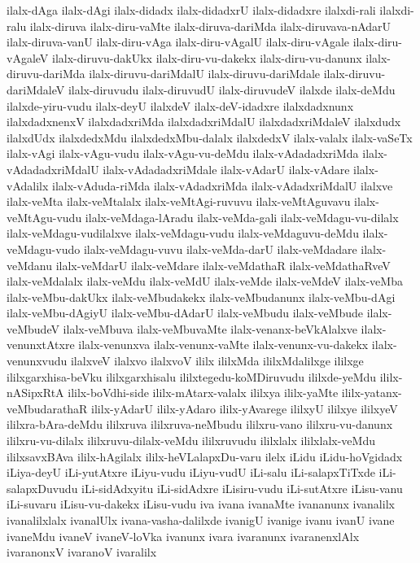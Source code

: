 {ilalx-dAga
ilalx-dAgi
ilalx-didadx
ilalx-didadxrU
ilalx-didadxre
ilalxdi-rali
ilalxdi-ralu
ilalx-diruva
ilalx-diru-vaMte
ilalx-diruva-dariMda
ilalx-diruvava-nAdarU
ilalx-diruva-vanU
ilalx-diru-vAga
ilalx-diru-vAgalU
ilalx-diru-vAgale
ilalx-diru-vAgaleV
ilalx-diruvu-dakUkx
ilalx-diru-vu-dakekx
ilalx-diru-vu-danunx
ilalx-diruvu-dariMda
ilalx-diruvu-dariMdalU
ilalx-diruvu-dariMdale
ilalx-diruvu-dariMdaleV
ilalx-diruvudu
ilalx-diruvudU
ilalx-diruvudeV
ilalxde
ilalx-deMdu
ilalxde-yiru-vudu
ilalx-deyU
ilalxdeV
ilalx-deV-idadxre
ilalxdadxnunx
ilalxdadxnenxV
ilalxdadxriMda
ilalxdadxriMdalU
ilalxdadxriMdaleV
ilalxdudx
ilalxdUdx
ilalxdedxMdu
ilalxdedxMbu-dalalx
ilalxdedxV
ilalx-valalx
ilalx-vaSeTx
ilalx-vAgi
ilalx-vAgu-vudu
ilalx-vAgu-vu-deMdu
ilalx-vAdadadxriMda
ilalx-vAdadadxriMdalU
ilalx-vAdadadxriMdale
ilalx-vAdarU
ilalx-vAdare
ilalx-vAdalilx
ilalx-vAduda-riMda
ilalx-vAdadxriMda
ilalx-vAdadxriMdalU
ilalxve
ilalx-veMta
ilalx-veMtalalx
ilalx-veMtAgi-ruvuvu
ilalx-veMtAguvavu
ilalx-veMtAgu-vudu
ilalx-veMdaga-lAradu
ilalx-veMda-gali
ilalx-veMdagu-vu-dilalx
ilalx-veMdagu-vudilalxve
ilalx-veMdagu-vudu
ilalx-veMdaguvu-deMdu
ilalx-veMdagu-vudo
ilalx-veMdagu-vuvu
ilalx-veMda-darU
ilalx-veMdadare
ilalx-veMdanu
ilalx-veMdarU
ilalx-veMdare
ilalx-veMdathaR
ilalx-veMdathaRveV
ilalx-veMdalalx
ilalx-veMdu
ilalx-veMdU
ilalx-veMde
ilalx-veMdeV
ilalx-veMba
ilalx-veMbu-dakUkx
ilalx-veMbudakekx
ilalx-veMbudanunx
ilalx-veMbu-dAgi
ilalx-veMbu-dAgiyU
ilalx-veMbu-dAdarU
ilalx-veMbudu
ilalx-veMbude
ilalx-veMbudeV
ilalx-veMbuva
ilalx-veMbuvaMte
ilalx-venanx-beVkAlalxve
ilalx-venunxtAtxre
ilalx-venunxva
ilalx-venunx-vaMte
ilalx-venunx-vu-dakekx
ilalx-venunxvudu
ilalxveV
ilalxvo
ilalxvoV
ililx
ililxMda
ililxMdalilxge
ililxge
ililxgarxhisa-beVku
ililxgarxhisalu
ililxtegedu-koMDiruvudu
ililxde-yeMdu
ililx-nASipxRtA
ililx-boVdhi-side
ililx-mAtarx-valalx
ililxya
ililx-yaMte
ililx-yatanx-veMbudarathaR
ililx-yAdarU
ililx-yAdaro
ililx-yAvarege
ililxyU
ililxye
ililxyeV
ililxra-bAra-deMdu
ililxruva
ililxruva-neMbudu
ililxru-vano
ililxru-vu-danunx
ililxru-vu-dilalx
ililxruvu-dilalx-veMdu
ililxruvudu
ililxlalx
ililxlalx-veMdu
ililxsavxBAva
ililx-hAgilalx
ililx-heVLalapxDu-varu
ilelx
iLidu
iLidu-hoVgidadx
iLiya-deyU
iLi-yutAtxre
iLiyu-vudu
iLiyu-vudU
iLi-salu
iLi-salapxTiTxde
iLi-salapxDuvudu
iLi-sidAdxyitu
iLi-sidAdxre
iLisiru-vudu
iLi-sutAtxre
iLisu-vanu
iLi-suvaru
iLisu-vu-dakekx
iLisu-vudu
iva
ivana
ivanaMte
ivananunx
ivanalilx
ivanalilxlalx
ivanalUlx
ivana-vasha-dalilxde
ivanigU
ivanige
ivanu
ivanU
ivane
ivaneMdu
ivaneV
ivaneV-loVka
ivanunx
ivara
ivaranunx
ivaranenxlAlx
ivaranonxV
ivaranoV
ivaralilx
}
